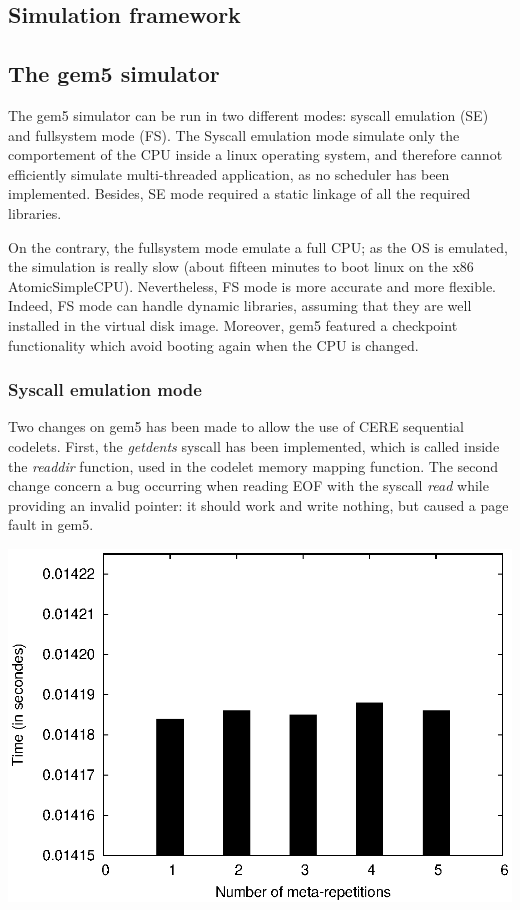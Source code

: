 \documentclass{article}
\newenvironment{Figure}
  {\par\medskip\noindent\minipage{\linewidth}}
  {\endminipage\par\bigskip\medskip}
\begin{document}
\begin{multicols}{2}
\section{Simulation framework}
\label{sim}

\subsection{The gem5 simulator}

The gem5 simulator can be run in two different modes: syscall emulation (SE) and fullsystem mode (FS). The Syscall emulation mode simulate only the comportement of the CPU inside a linux operating system, and therefore cannot efficiently simulate multi-threaded application, as no scheduler has been implemented. Besides, SE mode required a static linkage of all the required libraries.

On the contrary, the fullsystem mode emulate a full CPU; as the OS is emulated, the simulation is really slow (about fifteen minutes to boot linux on the x86 AtomicSimpleCPU). Nevertheless, FS mode is more accurate and more flexible. Indeed, FS mode can handle dynamic libraries, assuming that they are well installed in the virtual disk image. 
Moreover, gem5 featured a checkpoint functionality which avoid booting again when the CPU is changed. %
\subsubsection{Syscall emulation mode}
Two changes on gem5 has been made to allow the use of CERE sequential codelets. First, the \textit{getdents} syscall has been implemented, which is called inside the \textit{readdir} function, used in the codelet memory mapping function. The second change concern a bug occurring when reading EOF with the syscall \textit{read} while providing an invalid pointer: it should work and write nothing, but caused a page fault in gem5. 

\begin{Figure}
\centering
\includegraphics[width=\linewidth]{vari_se.eps}
\end{Figure}



\end{multicols}
\end{document}
